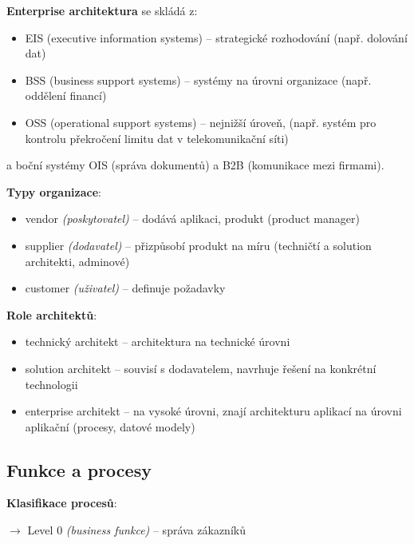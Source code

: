 \vspace{8pt}

\noindent \textbf{Enterprise architektura} se skládá z:
\begin{itemize}
    \item EIS (executive information systems) -- strategické rozhodování (např. dolování dat)
    \item BSS (business support systems) -- systémy na úrovni organizace (např. oddělení financí)
    \item OSS (operational support systems) -- nejnižší úroveň, (např. systém pro kontrolu překročení limitu dat v telekomunikační síti)
\end{itemize}

\noindent a boční systémy OIS (správa dokumentů) a B2B (komunikace mezi firmami).

\vspace{8pt}
\noindent \textbf{Typy organizace}:
\begin{itemize}
    \item vendor \textit{(poskytovatel)} -- dodává aplikaci, produkt (product manager)
    \item supplier \textit{(dodavatel)} -- přizpůsobí produkt na míru (techničtí a solution architekti, adminové)
    \item customer \textit{(uživatel)} -- definuje požadavky
\end{itemize}

\vspace{8pt}

\noindent \textbf{Role architektů}:

\begin{itemize}
    \item technický architekt -- architektura na technické úrovni
    \item solution architekt -- souvisí s dodavatelem, navrhuje řešení na konkrétní technologii
    \item enterprise architekt -- na vysoké úrovni, znají architekturu aplikací na úrovni aplikační (procesy, datové modely)
\end{itemize}

\subsection{Funkce a procesy}

\noindent \textbf{Klasifikace procesů}:

$\to$ Level 0 \textit{(business funkce)} -- správa zákazníků

